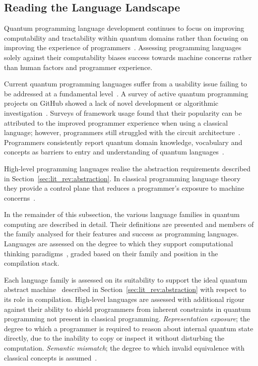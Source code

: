 \subsection{Reading the Language Landscape}\label{subsec:lit_rev:qpl:reading}
Quantum programming language development continues to focus on improving computability and tractability within quantum domains rather than focusing on improving the experience of programmers~\cite{corralesgarro2025productivityexpressiveness}.
Assessing programming languages solely against their computability biases success towards machine concerns rather than human factors and programmer experience.

Current quantum programming languages suffer from a usability issue failing to be addressed at a fundamental level~\cite{ferreira2024qplusage, nunez_corrales2025betterabstractmachines}.
A survey of active quantum programming projects on GitHub showed a lack of novel development or algorithmic investigation~\cite{murillo2022sequantumprogramming}.
Surveys of framework usage found that their popularity can be attributed to the improved programmer experience when using a classical language; however, programmers still struggled with the circuit architecture~\cite{ferreira2024qplusage}.
Programmers consistently report quantum domain knowledge, vocabulary and concepts as barriers to entry and understanding of quantum languages~\cite{ferreira2024qplusage, murillo2022sequantumprogramming}.

High-level programming languages realise the abstraction requirements described in Section~\ref{sec:lit_rev:abstraction}.
In classical programming language theory they provide a control plane that reduces a programmer's exposure to machine concerns~\cite{scott2009plp}.

In the remainder of this subsection, the various language families in quantum computing are described in detail.
Their definitions are presented and members of the family analysed for their features and success as programming languages.
Languages are assessed on the degree to which they support computational thinking paradigms~\cite{Wing2006ComputationalThinking}, graded based on their family and position in the compilation stack.

Each language family is assessed on its suitability to support the ideal quantum abstract machine~\cite{nunez_corrales2025betterabstractmachines} described in Section~\ref{sec:lit_rev:abstraction} with respect to its role in compilation.
High-level languages are assessed with additional rigour against their ability to shield programmers from inherent constraints in quantum programming not present in classical programming.
\textit{Representation exposure}; the degree to which a programmer is required to reason about internal quantum state directly, due to the inability to copy or inspect it without disturbing the computation.
\textit{Semantic mismatch}; the degree to which invalid equivalence with classical concepts is assumed~\cite{yuan2025foundationalabstractions}.


